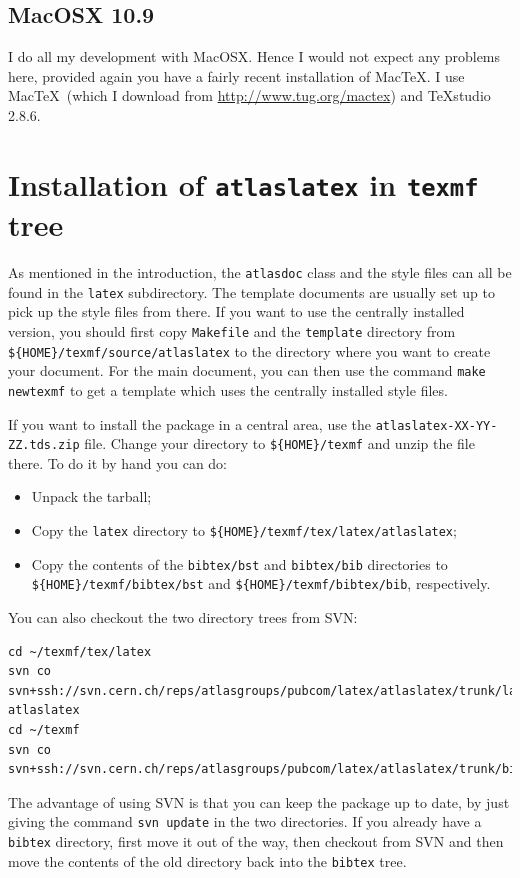 \documentclass[atlasstyle,UKenglish]{latex/atlasdoc}
\newcommand{\File}[1]{\texttt{#1}\xspace}
\newcommand{\Package}[1]{\texttt{#1}\xspace}
\begin{document}
\subsection{MacOSX 10.9}

I do all my development with MacOSX.
Hence I would not expect any problems here, provided again you have a fairly recent
installation of Mac\TeX.
I use	Mac\TeX\ (which I download from \url{http://www.tug.org/mactex}) and TeXstudio 2.8.6.


\section{Installation of \Package{atlaslatex} in \File{texmf} tree}
\label{sec:texmf}

As mentioned in the introduction, the \texttt{atlasdoc} class and the style files can all be found in the 
\File{latex} subdirectory. The template documents are usually set up to pick up the style files from there.
If you want to use the centrally installed version,
you should first copy \File{Makefile} and the \File{template} directory from 
\File{\$\{HOME\}/texmf/source/atlaslatex} to the directory where you want to create your document.
For the main document, you can then use the command \texttt{make newtexmf} to get a template which uses the
centrally installed style files.

If you want to install the package in a central area, use the \File{atlaslatex-XX-YY-ZZ.tds.zip} file.
Change your directory to \File{\$\{HOME\}/texmf} and unzip the file there. To do it by hand you can do:
\begin{itemize}
\item Unpack the tarball;
\item Copy the \texttt{latex} directory to \File{\$\{HOME\}/texmf/tex/latex/atlaslatex};
\item Copy the contents of the \File{bibtex/bst} and \File{bibtex/bib} directories 
  to \texttt{\$\{HOME\}/texmf/bibtex/bst} and \texttt{\$\{HOME\}/texmf/bibtex/bib}, respectively.
\end{itemize}
You can also checkout the two directory trees from SVN:
{\small
\begin{verbatim}
cd ~/texmf/tex/latex
svn co svn+ssh://svn.cern.ch/reps/atlasgroups/pubcom/latex/atlaslatex/trunk/latex atlaslatex
cd ~/texmf
svn co svn+ssh://svn.cern.ch/reps/atlasgroups/pubcom/latex/atlaslatex/trunk/bibtex
\end{verbatim}
}
The advantage of using SVN is that you can keep the package up to date, by just giving the command
\verb|svn update| in the two directories.
If you already have a \File{bibtex} directory, 
first move it out of the way, then checkout from SVN
and then move the contents of the old directory back into the \File{bibtex} tree.
\end{document}

